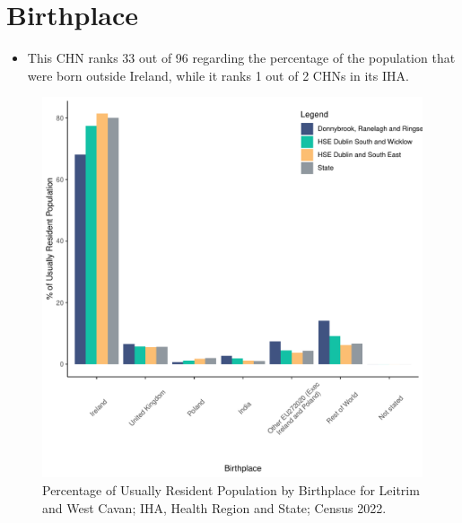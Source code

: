 \documentclass{article}
\begin{document}
\section{Birthplace}\label{sect:Birth}
\begin{itemize}
\item This CHN ranks  33 out of 96 regarding the percentage of the population that were born outside Ireland, while it ranks  1 out of 2 CHNs in its IHA.
\end{itemize}
\begin{figure}[H]
	\centering
	\includegraphics[width = 130mm]{../figures/BirthED.pdf}
	\caption{Percentage of Usually Resident Population by Birthplace for Leitrim and West Cavan; IHA, Health Region and State; Census 2022.}
	\label{fig:vbnv}
	\end{figure}
	
\end{document}

